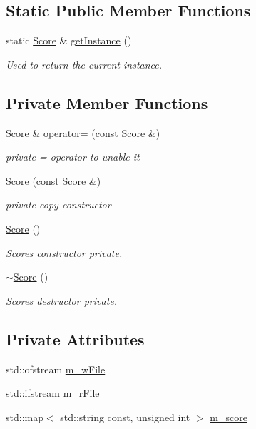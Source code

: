 \subsection*{Static Public Member Functions}
\begin{DoxyCompactItemize}
\item 
static \hyperlink{class_score}{Score} \& \hyperlink{class_score_a4e5e9dc104bc5d584c6bb956f01298d1}{get\+Instance} ()
\begin{DoxyCompactList}\small\item\em Used to return the current instance. \end{DoxyCompactList}\end{DoxyCompactItemize}
\subsection*{Private Member Functions}
\begin{DoxyCompactItemize}
\item 
\hyperlink{class_score}{Score} \& \hyperlink{class_score_a2eceab448e618bfe8483cbaacdcc2d57}{operator=} (const \hyperlink{class_score}{Score} \&)
\begin{DoxyCompactList}\small\item\em private = operator to unable it \end{DoxyCompactList}\item 
\hyperlink{class_score_a22637cafca7ae4a1aba0559bba58c74c}{Score} (const \hyperlink{class_score}{Score} \&)
\begin{DoxyCompactList}\small\item\em private copy constructor \end{DoxyCompactList}\item 
\hyperlink{class_score_a039c99843551e5e4b512ecee99e46617}{Score} ()
\begin{DoxyCompactList}\small\item\em \hyperlink{class_score}{Score}\textquotesingle{}s constructor private. \end{DoxyCompactList}\item 
\hyperlink{class_score_a54ab36a6fdd88696f0176d9534a76883}{$\sim$\+Score} ()
\begin{DoxyCompactList}\small\item\em \hyperlink{class_score}{Score}\textquotesingle{}s destructor private. \end{DoxyCompactList}\end{DoxyCompactItemize}
\subsection*{Private Attributes}
\begin{DoxyCompactItemize}
\item 
std\+::ofstream \hyperlink{class_score_a8e223eb909ffc9773a466d3e3adae2ad}{m\+\_\+w\+File}
\item 
std\+::ifstream \hyperlink{class_score_ad2f89d43a25f346c8a90951ca94cca38}{m\+\_\+r\+File}
\item 
std\+::map$<$ std\+::string const, unsigned int $>$ \hyperlink{class_score_a6eba3f6ec553d618869dcd0355d47934}{m\+\_\+score}
\end{DoxyCompactItemize}
